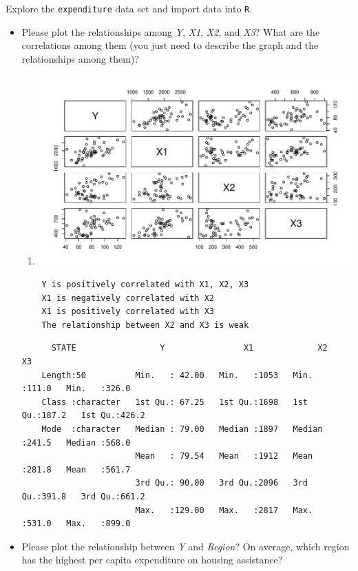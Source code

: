 \documentclass[12pt,letterpaper]{article}
\begin{document}
\vspace{.5cm}
\noindent Explore the \texttt{expenditure} data set and import data into \texttt{R}.
\vspace{.5cm}
  
\vspace{.5cm}
\begin{itemize}

\item
Please plot the relationships among \emph{Y}, \emph{X1}, \emph{X2}, and \emph{X3}? What are the correlations among them (you just need to describe the graph and the relationships among them)?


    \begin{enumerate}
	\item[]
	\includegraphics[width=.85\textwidth]{plot.all relationship_RJ.C.pdf}
   \end{enumerate}
   \begin{verbatim}
   	Y is positively correlated with X1, X2, X3
   	X1 is negatively correlated with X2
   	X1 is positively correlated with X3
   	The relationship between X2 and X3 is weak
   \end{verbatim}
	\begin{verbatim}
	  STATE                 Y                X1             X2              X3       
	Length:50          Min.   : 42.00   Min.   :1053   Min.   :111.0   Min.   :326.0  
	Class :character   1st Qu.: 67.25   1st Qu.:1698   1st Qu.:187.2   1st Qu.:426.2  
	Mode  :character   Median : 79.00   Median :1897   Median :241.5   Median :568.0  
	                   Mean   : 79.54   Mean   :1912   Mean   :281.8   Mean   :561.7  
	                   3rd Qu.: 90.00   3rd Qu.:2096   3rd Qu.:391.8   3rd Qu.:661.2  
	                   Max.   :129.00   Max.   :2817   Max.   :531.0   Max.   :899.0 
  \end{verbatim} 
\vspace{.5cm}
\item
Please plot the relationship between \emph{Y} and \emph{Region}? On average, which region has the highest per capita expenditure on housing assistance?


\end{itemize}
\end{document}

